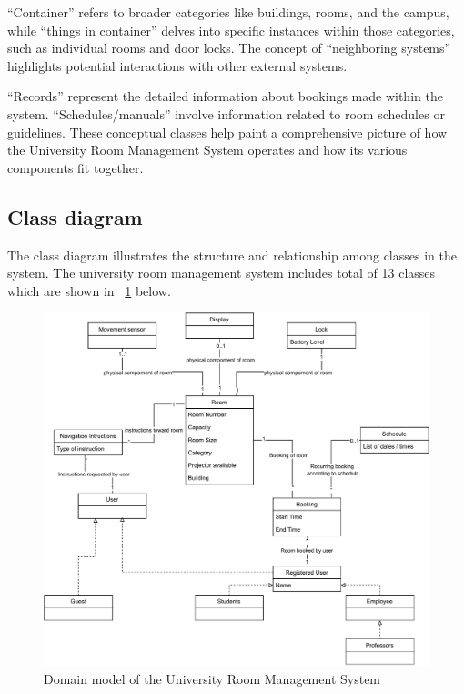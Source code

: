\documentclass[conference,onecolumn]{IEEEtran}
\begin{document}
	``Container'' refers to broader categories like buildings, rooms, and the campus, while ``things in container'' delves into specific instances within those categories, such as individual rooms and door locks. The concept of ``neighboring systems'' highlights potential interactions with other external systems.
	
	``Records'' represent the detailed information about bookings made within the system. ``Schedules/manuals'' involve information related to room schedules or guidelines. These conceptual classes help paint a comprehensive picture of how the University Room Management System operates and how its various components fit together.

\subsection{Class diagram}
	The class diagram illustrates the structure and relationship among classes in the system. The university room management system includes total of 13 classes which are shown in \figurename~\ref{fig:classdiagram} below.

	\begin{figure}[H]
		\centering
		\includegraphics[width=1\textwidth]{Figures/DomainModel.pdf}
		\caption{Domain model of the University Room Management System}
		\label{fig:classdiagram}
	\end{figure}
\end{document}
